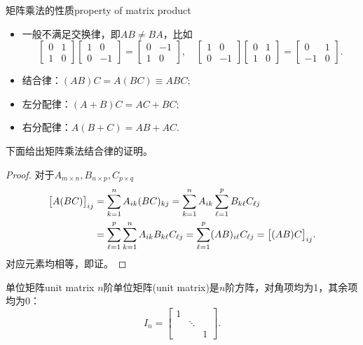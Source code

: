 \begin{theorem}{矩阵乘法的性质}{property of matrix product}
    \begin{itemize}
    	\item 一般不满足交换律，即$AB\neq BA$，比如
    	\[
    		\begin{bmatrix}
    			0&1\\1&0
    		\end{bmatrix}\begin{bmatrix}
    			1&0\\0&-1
    		\end{bmatrix}=\begin{bmatrix}
    			0&-1\\1&0
    		\end{bmatrix},\quad\begin{bmatrix}
    			1&0\\0&-1
    		\end{bmatrix}\begin{bmatrix}
    			0&1\\1&0
    		\end{bmatrix}=\begin{bmatrix}
    			0&1\\-1&0
    		\end{bmatrix}.
    	\]
        \item 结合律：$(AB)C=A(BC)\equiv ABC;$
    	\item 左分配律：$(A+B)C=AC+BC;$
    	\item 右分配律：$A(B+C)=AB+AC.$
    \end{itemize}
\end{theorem}
下面给出矩阵乘法结合律的证明。
\begin{proof}
	对于$A_{m\times n},B_{n\times p},C_{p\times q}$
	\begin{align*}
		\bigl[A(BC)\bigr]_{ij}&=\sum_{k=1}^nA_{ik}(BC)_{kj}=\sum_{k=1}^nA_{ik}\sum_{\ell=1}^pB_{k\ell}C_{\ell j}\\
		&=\sum_{\ell=1}^p\sum_{k=1}^nA_{ik}B_{k\ell}C_{\ell j}=\sum_{\ell=1}^p(AB)_{i\ell}C_{\ell j}=\bigl[(AB)C\bigr]_{ij}.
	\end{align*}
	对应元素均相等，即证。
\end{proof}
\begin{definition}{单位矩阵}{unit matrix}
	$n$阶单位矩阵(unit matrix)是$n$阶方阵，对角项均为1，其余项均为0：
	\[
		I_n=\begin{bmatrix}
		1&\\ &\ddots\\&&1
		\end{bmatrix}.
	\]
\end{definition}
